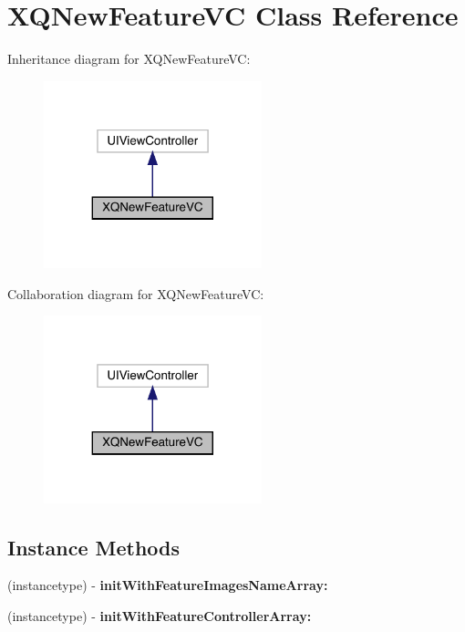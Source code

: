 \hypertarget{interface_x_q_new_feature_v_c}{}\section{X\+Q\+New\+Feature\+VC Class Reference}
\label{interface_x_q_new_feature_v_c}


Inheritance diagram for X\+Q\+New\+Feature\+VC\+:\nopagebreak
\begin{figure}[H]
\begin{center}
\leavevmode
\includegraphics[width=179pt]{interface_x_q_new_feature_v_c__inherit__graph}
\end{center}
\end{figure}


Collaboration diagram for X\+Q\+New\+Feature\+VC\+:\nopagebreak
\begin{figure}[H]
\begin{center}
\leavevmode
\includegraphics[width=179pt]{interface_x_q_new_feature_v_c__coll__graph}
\end{center}
\end{figure}
\subsection*{Instance Methods}
\begin{DoxyCompactItemize}
\item 
\mbox{\label{interface_x_q_new_feature_v_c_ab1c8d58fd6a5dbf6b38fe3ac5188f0cd}} 
(instancetype) -\/ {\bfseries init\+With\+Feature\+Images\+Name\+Array\+:}
\item 
\mbox{\label{interface_x_q_new_feature_v_c_af39c7bae9df90e2ff46739dcd97605a4}} 
(instancetype) -\/ {\bfseries init\+With\+Feature\+Controller\+Array\+:}
\end{DoxyCompactItemize}
